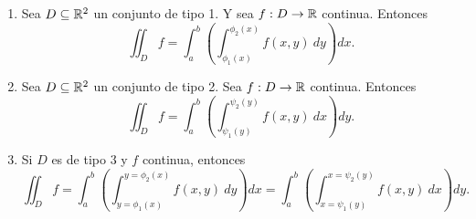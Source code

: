 \begin{corollary} \label{col:fubini}
    \begin{enumerate}
        \item Sea $D\subseteq\mathbb{R}^2$ un conjunto de tipo 1. Y sea $f:D\to\mathbb{R}$ continua. Entonces
        \[
            \iint_D f=\int_a^b\left(\int_{\phi_1(x)}^{\phi_2(x)}f(x,y)\:dy\right)dx.  
        \]
        \item Sea $D\subseteq\mathbb{R}^2$ un conjunto de tipo 2. Sea $f:D\to\mathbb{R}$ continua.
        Entonces
        \[
            \iint_D f=\int_a^b\left(\int_{\psi_1(y)}^{\psi_2(y)}f(x,y)\:dx\right)dy.  
        \]
        \item Si $D$ es de tipo 3 y $f$
        continua, entonces 
        \[
            \iint_D f=\int_a^b\left(\int_{y=\phi_1(x)}^{y=\phi_2(x)}f(x,y)\:dy\right)dx=\int_a^b\left(\int_{x=\psi_1(y)}^{x=\psi_2(y)}f(x,y)\:dx\right)dy. 
        \]
    \end{enumerate}
\end{corollary}
